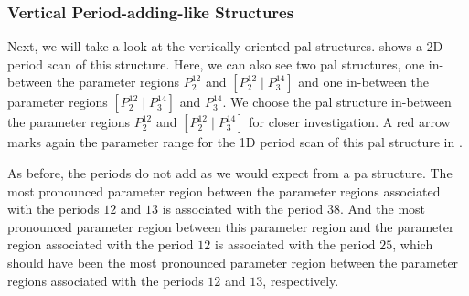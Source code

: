 \subsubsection{Vertical Period-adding-like Structures}

Next, we will take a look at the vertically oriented \gls{pal} structures.
 shows a 2D period scan of this structure.
Here, we can also see two \gls{pal} structures, one in-between the parameter regions $P^{12}_2$ and $\left[P^{12}_2 \mid P^{14}_3\right]$ and one in-between the parameter regions $\left[P^{12}_2 \mid P^{14}_3\right]$ and $P^{14}_3$.
We choose the \gls{pal} structure in-between the parameter regions $P^{12}_2$ and $\left[P^{12}_2 \mid P^{14}_3\right]$ for closer investigation.
A red arrow marks again the parameter range for the 1D period scan of this \gls{pal} structure in .

As before, the periods do not add as we would expect from a \gls{pa} structure.
The most pronounced parameter region between the parameter regions associated with the periods $12$ and $13$ is associated with the period $38$.
And the most pronounced parameter region between this parameter region and the parameter region associated with the period $12$ is associated with the period $25$, which should have been the most pronounced parameter region between the parameter regions associated with the periods $12$ and $13$, respectively.

